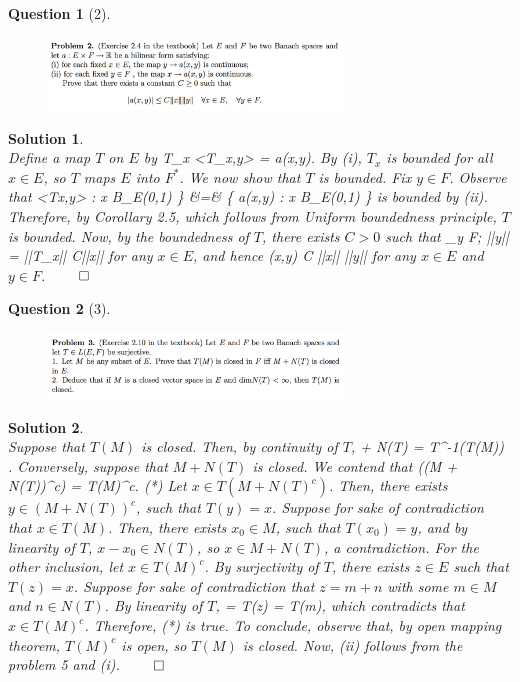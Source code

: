 \documentclass{article} %
\def\eQb#1\eQe{\begin{eqnarray*}#1\end{eqnarray*}}
\theoremstyle{quest}
\newtheorem*{question}{Question}
\newtheorem*{solution}{Solution}
\begin{document}
\newpage

\begin{question}[2]
\hfill
\begin{figure}[h!]
  \centering
    \includegraphics[width=0.7\textwidth]{funcA-h-e2-p2.png}
\end{figure}
\end{question}
\begin{solution} \hfill \\
Define a map $T$ on $E$ by 
\eQb
x \mapsto T_x \>\>\>  \>\>\> <T_x,y> = a(x,y).
\eQe
By (i), $T_x$ is bounded for all $x \in E$, so $T$ maps $E$
into $F^*$. We now show that $T$ is bounded. 
Fix $y \in F$. Observe that
\eQb
\{ <Tx,y> \> : \> x \in B_{E}(0,1) \} &=& \{ a(x,y) \> : \> x \in B_E(0,1) \}
\eQe
is bounded by (ii). Therefore, by Corollary 2.5, which follows from
Uniform boundedness principle, $T$ is bounded. 
Now, by the boundedness of $T$, there 
exists $C > 0$ such that
\eQb
\sup_{y \in F; ||y|| }  = ||T_x|| \leq C||x||
\eQe
for any $x \in E$, and hence
\eQb
a(x,y) \leq C ||x|| ||y||
\eQe
for any $x \in E$ and $y \in F$. \hfill $\qed$
\end{solution}

\newpage

\begin{question}[3]
\hfill
\begin{figure}[h!]
  \centering
    \includegraphics[width=0.7\textwidth]{funcA-h-e2-p3.png}
\end{figure}
\end{question}
\begin{solution} \hfill \\
Suppose that $T(M)$ is closed. Then, by continuity of $T$,
\eQb
M + N(T) = T^{-1}(T(M)) \>\>\> .
\eQe
Conversely, suppose that $M + N(T)$ is closed. We contend that
\eQb
T((M + N(T))^c) = T(M)^c. \>\>\> (*) 
\eQe 
Let $x \in T(M + N(T)^c)$. Then, there exists $y \in (M + N(T))^c$, 
such that $T(y) = x$. Suppose for sake of contradiction that $x \in T(M)$. 
Then, there exists $x_0 \in M$, such that $T(x_0) = y$, and by linearity of $T$,
$x - x_0 \in N(T)$, so $x \in M + N(T)$, a contradiction. 
For the other inclusion, let $x \in T(M)^c$. By surjectivity of $T$,
there exists $z \in E$ such that $T(z) = x$. Suppose for sake of contradiction
that $z = m + n$ with some $m \in M$ and $n \in N(T)$. By linearity of $T$,
\eQb
x = T(z) = T(m), 
\eQe 
which contradicts that $x \in T(M)^c$. Therefore, (*) is true.
To conclude, observe that,
by open mapping theorem, $T(M)^c$ is open, so $T(M)$ is closed.
Now, (ii) follows from the problem 5 and (i). \hfill $\qed$

\end{solution}
\end{document}

